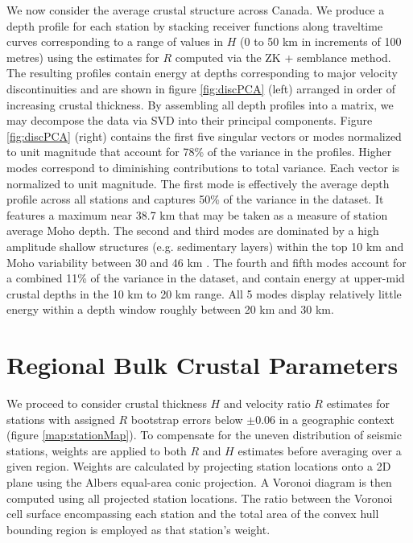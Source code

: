 \documentclass[msc,oneside]{ubcthesis}
\begin{document}
We now consider the average crustal structure across Canada. We produce a depth profile for each station by stacking receiver functions along traveltime curves corresponding to a range of values in $H$ (0 to 50 km in increments of 100 metres) using the estimates for $R$ computed via the ZK + semblance method. The resulting profiles contain energy at depths corresponding to major velocity discontinuities and are shown in figure \ref{fig:discPCA} (left) arranged in order of increasing crustal thickness. By assembling all depth profiles into a matrix, we may decompose the data via SVD into their principal components. Figure \ref{fig:discPCA} (right) contains the first five singular vectors or modes normalized to unit magnitude that account for 78\% of the variance in the profiles. Higher modes correspond to diminishing contributions to total variance. Each vector is normalized to unit magnitude. The first mode is effectively the average depth profile across all stations and captures 50\% of the variance in the dataset. It features a maximum near 38.7 km that may be taken as a measure of station average Moho depth. The second and third modes are dominated by a high amplitude shallow structures (e.g. sedimentary layers) within the top 10 km and Moho variability between 30 and 46 km . The fourth and fifth modes account for a combined 11\% of the variance in the dataset, and contain energy at upper-mid crustal depths in the 10 km to 20 km range. All 5 modes display relatively little energy within a depth window roughly between 20 km and 30 km.



\section{Regional Bulk Crustal Parameters}

We proceed to consider crustal thickness $H$ and velocity ratio $R$ estimates for stations with assigned $R$ bootstrap errors below $\pm 0.06$ in a geographic context (figure \ref{map:stationMap}). To compensate for the uneven distribution of seismic stations, weights are applied to both $R$ and $H$ estimates before averaging over a given region. Weights are calculated by projecting station locations onto a 2D plane using the Albers equal-area conic projection. A Voronoi diagram is then computed using all projected station locations. The ratio between the Voronoi cell surface encompassing each station and the total area of the convex hull bounding region is employed as that station's weight.
\end{document}
